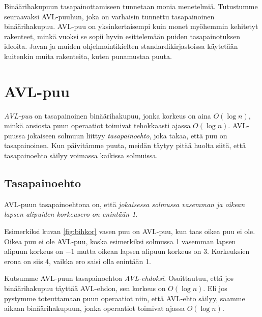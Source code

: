 Binäärihakupuun tasapainottamiseen tunnetaan monia menetelmiä.
Tutustumme seuraavaksi AVL-puuhun, joka on 
varhaisin tunnettu tasapainoinen binäärihakupuu.
AVL-puu on yksinkertaisempi kuin monet myöhemmin
kehitetyt rakenteet, minkä vuoksi se sopii hyvin esittelemään
puiden tasapainotuksen ideoita.
Javan ja muiden ohjelmointikielten standardikirjastoissa
käyte\-tään kuitenkin muita rakenteita, kuten punamustaa puuta.

\section{AVL-puu}


\emph{AVL-puu} on tasapainoinen binäärihakupuu, jonka
korkeus on aina $O(\log n)$, minkä ansiosta puun operaatiot
toimivat tehokkaasti ajassa $O(\log n)$.
AVL-puussa jokaiseen solmuun liittyy \emph{tasapainoehto},
joka takaa, että puu on tasapainoinen.
Kun päivitämme puuta, meidän täytyy pitää huolta siitä,
että tasapainoehto säilyy voimassa kaikissa solmuissa.

\subsection{Tasapainoehto}

AVL-puun tasapainoehtona on, että
\emph{jokaisessa solmussa vasemman ja oikean lapsen
alipuiden korkeusero on enintään 1}.

Esimerkiksi kuvan \ref{fig:bihkor} vasen puu on
AVL-puu, kun taas oikea puu ei ole.
Oikea puu ei ole AVL-puu, koska esimerkiksi solmussa 1
vasemman lapsen alipuun korkeus on $-1$ mutta oikean lapsen
alipuun korkeus on 3.
Korkeuksien erona on siis 4, vaikka ero saisi olla enintään 1.


Kutsumme AVL-puun tasapainoehtoa \emph{AVL-ehdoksi}.
Osoittautuu, että jos binäärihakupuu täyttää AVL-ehdon,
sen korkeus on $O(\log n)$.
Eli jos pystymme toteuttamaan puun operaatiot niin,
että AVL-ehto säilyy, saamme aikaan binäärihakupuun,
jonka operaatiot toimivat ajassa $O(\log n)$.

